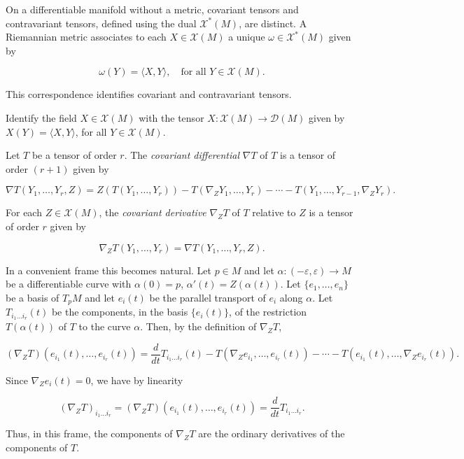 \begin{remark}[Remark 5.5]
  \label{rem:dc-ch4-5-5}
  On a differentiable manifold without a metric, covariant tensors and
  contravariant tensors, defined using the dual $\mathcal{X}^*(M)$, are distinct.
  A Riemannian metric associates to each $X\in\mathcal{X}(M)$ a unique
  $\omega\in\mathcal{X}^*(M)$ given by
  
  $$
  \omega(Y)=\langle X,Y\rangle,\quad\text{for all }Y\in\mathcal{X}(M).
  $$
  
  This correspondence identifies covariant and contravariant tensors.
\end{remark}

\begin{remark}[Remark 5.6]
  \label{rem:dc-ch4-5-6}
  Identify the field $X\in\mathcal{X}(M)$ with the tensor
  $X:\mathcal{X}(M)\to\mathcal{D}(M)$ given by $X(Y)=\langle X,Y\rangle$,
  for all $Y\in\mathcal{X}(M)$.
\end{remark}

\begin{definition}
  \label{def:dc-ch4-5-7}
  \leanok
  Let $T$ be a tensor of order $r$. The \emph{covariant differential} $\nabla T$ of $T$
  is a tensor of order $(r+1)$ given by
  
  $$
  \nabla T(Y_1,\dots,Y_r,Z)=Z(T(Y_1,\dots,Y_r))-T(\nabla_Z Y_1,\dots,Y_r)-\cdots-T(Y_1,\dots,Y_{r-1},\nabla_Z Y_r).
  $$
  
  For each $Z\in\mathcal{X}(M)$, the \emph{covariant derivative} $\nabla_Z T$ of $T$
  relative to $Z$ is a tensor of order $r$ given by
  
  $$
  \nabla_Z T(Y_1,\dots,Y_r)=\nabla T(Y_1,\dots,Y_r,Z).
  $$
  
  In a convenient frame this becomes natural. Let $p\in M$ and let
  $\alpha:(-\varepsilon,\varepsilon)\to M$ be a differentiable curve with $\alpha(0)=p$,
  $\alpha'(t)=Z(\alpha(t))$. Let $\{e_1,\dots,e_n\}$ be a basis of $T_pM$ and let
  $e_i(t)$ be the parallel transport of $e_i$ along $\alpha$. Let $T_{i_1\dots i_r}(t)$
  be the components, in the basis $\{e_i(t)\}$, of the restriction $T(\alpha(t))$ of
  $T$ to the curve $\alpha$. Then, by the definition of $\nabla_Z T$,
  
  $$
  (\nabla_Z T)(e_{i_1}(t),\dots,e_{i_r}(t))=\frac{d}{dt}T_{i_1\dots i_r}(t)-T(\nabla_Z e_{i_1},\dots,e_{i_r}(t))-\cdots-T(e_{i_1}(t),\dots,\nabla_Z e_{i_r}(t)).
  $$
  
  Since $\nabla_Z e_i(t)=0$, we have by linearity
  
  $$
  (\nabla_Z T)_{i_1\dots i_r}=(\nabla_Z T)(e_{i_1}(t),\dots,e_{i_r}(t))=\frac{d}{dt}T_{i_1\dots i_r}.
  $$
  
  Thus, in this frame, the components of $\nabla_ZT$ are the ordinary derivatives
  of the components of $T$.
\end{definition}

